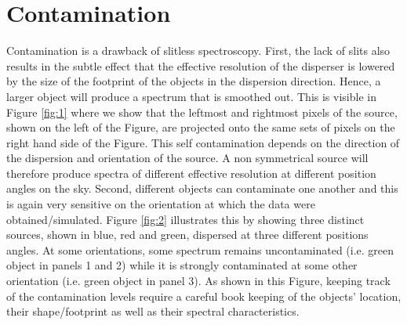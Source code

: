 \documentclass[preprint]{aastex}
\begin{document}
\section{Contamination}
Contamination is a drawback of slitless spectroscopy. First, the lack of slits also results in the subtle effect that the effective resolution of the disperser is lowered by the size of the footprint of the objects in the dispersion direction. Hence, a larger object will produce a spectrum that is smoothed out. This is visible in Figure \ref{fig:1} where we show that the leftmost and rightmost pixels of the source, shown on the left of the Figure, are projected onto the same sets of pixels on the right hand side of the Figure. This self contamination depends on the direction of the dispersion and orientation of the source. A non symmetrical source will therefore produce spectra of different effective resolution at different position angles on the sky. Second, different objects can contaminate one another and this is again very sensitive on the orientation at which the data were obtained/simulated. Figure \ref{fig:2} illustrates this by showing three distinct sources, shown in blue, red and green, dispersed at three different positions angles. At some orientations, some spectrum remains uncontaminated (i.e. green object in panels 1 and 2) while it is strongly contaminated at some other orientation (i.e. green object in panel 3). As shown in this Figure, keeping track of the contamination levels require a careful book keeping of the objects' location, their shape/footprint as well as their spectral characteristics.
\end{document}

